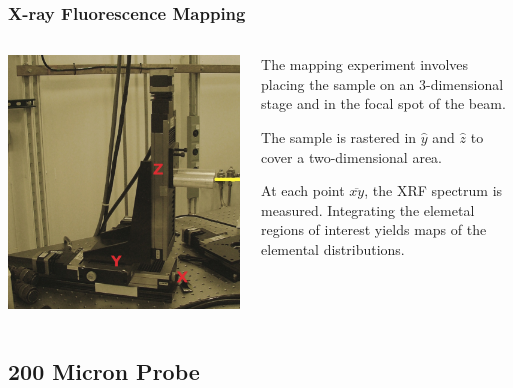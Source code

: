 \documentclass[10pt, xcolor=x11names, compress]{beamer}
\begin{document}
\begin{frame}
  \frametitle{X-ray Fluorescence Mapping}

  \begin{columns}
    \begin{column}{0.5\linewidth}
      \includegraphics[width=0.9\linewidth]{xrf/raster.jpg}
    \end{column}
    \begin{column}{0.5\linewidth}
      The mapping experiment involves placing the sample on an
      3-dimensional stage and in the focal spot of the beam.

      \bigskip

      The sample is rastered in $\hat{y}$ and $\hat{z}$ to cover a
      two-dimensional area.

      \bigskip

      At each point $\overline{xy}$, the XRF spectrum is measured.
      Integrating the elemetal regions of interest yields maps of the
      elemental distributions.
    \end{column}
  \end{columns}
\end{frame}

\subsection[200 $\mu$m]{200 Micron Probe}
\end{document}
